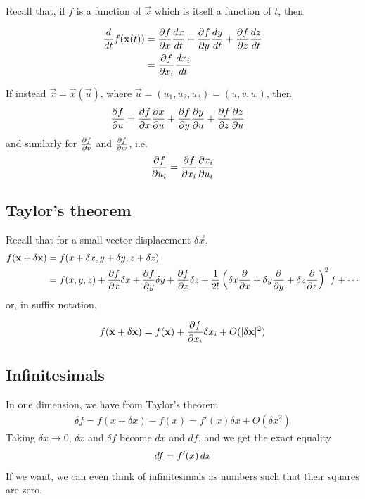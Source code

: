 \documentclass{../template/note}
\begin{document}
    Recall that, if \(f\) is a function of \(\vec x\) which is itself a function of \(t\), then
    \begin{proposition}
        \begin{align*}
            \frac{d}{dt} f(\vec x(t)) &= \pd{f}{x} \frac{dx}{dt} + \pd{f}{y} \frac{dy}{dt} + \pd{f}{z} \frac{dz}{dt} \\
            &= \pd {f}{x_i} \frac{dx_i}{dt}
        \end{align*} \label{1.1}
    \end{proposition}
    
    
    If instead \(\vec x = \vec x(\vec u)\), where \(\vec u = (u_1, u_2, u_3) = (u, v, w)\), then
    \begin{align*}
        \pd{f}{u} &= \pd{f}{x} \pd{x}{u} + \pd{f}{y} \pd{y}{u} + \pd{f}{z} \pd{z}{u}
    \end{align*}
    and similarly for \(\pd{f}{v}\) and \(\pd{f}{w}\), i.e.
    \begin{align*}
        \pd {f}{u_i} = \pd {f}{x_i} \pd {x_i}{u_i}
    \end{align*}
    
    \subsection{Taylor's theorem}

    Recall that for a small vector displacement \(\delta \vec x\),
    \begin{align*}
        f(\vec x + \delta \vec x) &= f(x + \delta x, y + \delta y, z + \delta z) \\
        &= f(x, y, z) + \pd f x \delta x + \pd f y \delta y + \pd f z \delta z + \frac{1}{2!} \left(\delta x \pd{}{x} + \delta y \pd{}{y} + \delta z \pd {}{z}\right)^2f + \cdots
    \end{align*}
    or, in suffix notation,
    \begin{proposition}
        \label{1.2} \[
            f(\vec x + \delta \vec x) = f(\vec x) + \pd{f}{x_i} \delta x_i + O(|\delta \vec x|^2)
        \]
    \end{proposition}
    
    
    
    
    \subsection{Infinitesimals}
    
    In one dimension, we have from Taylor's theorem
    \begin{align*}
        \delta f = f(x + \delta x) - f(x) = f'(x) \delta x + O(\delta x^2)
    \end{align*}
    Taking \(\delta x \to 0\), \(\delta x\) and \(\delta f\) become \(dx\) and \(df\), and we get the exact equality
    \begin{align*}
        df = f'(x) \,d{x}
    \end{align*}
    If we want, we can even think of infinitesimals as numbers such that their squares are zero.
\end{document}
